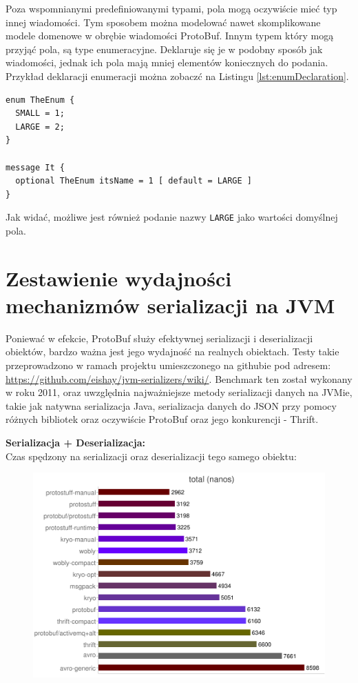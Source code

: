 Poza wspomnianymi predefiniowanymi typami, pola mogą oczywiście mieć typ innej wiadomości. Tym sposobem można modelować nawet skomplikowane modele domenowe
w obrębie wiadomości ProtoBuf. Innym typem który mogą przyjąć pola, są type enumeracyjne. Deklaruje się je w podobny sposób jak wiadomości, jednak 
ich pola mają mniej elementów koniecznych do podania. Przykład deklaracji enumeracji można zobaczć na Listingu \ref{lst:enumDeclaration}.

\begin{lstlisting}[caption={Deklaracja oraz zastosowanie typu enumeracyjnego}, label={lst:enumDeclaration}]
enum TheEnum {
  SMALL = 1;
  LARGE = 2;
}

message It {
  optional TheEnum itsName = 1 [ default = LARGE ]
}
\end{lstlisting}

Jak widać, możliwe jest również podanie nazwy \verb|LARGE| jako wartości domyślnej pola.


\section{Zestawienie wydajności mechanizmów serializacji na JVM}
\label{sec:serialization_speed}

Poniewać w efekcie, ProtoBuf służy efektywnej serializacji i deserializacji obiektów, bardzo ważna jest jego wydajność na realnych obiektach.
Testy takie przeprowadzono w ramach projektu umieszczonego na githubie pod adresem: \href{https://github.com/eishay/jvm-serializers/wiki/}{https://github.com/eishay/jvm-serializers/wiki/}.
Benchmark \cite{proto_benchmark} ten został wykonany w roku 2011, oraz uwzględnia najważniejsze metody serializacji danych na JVMie, takie jak
natywna serializacja Java, serializacja danych do JSON przy pomocy różnych bibliotek oraz oczywiście ProtoBuf oraz jego konkurencji - Thrift.

\textbf{Serializacja + Deserializacja:}\\
Czas spędzony na serializacji oraz deserializacji tego samego obiektu:

\begin{figure}[ch!]
\includegraphics[width=\textwidth]{proto_1}
\end{figure}

